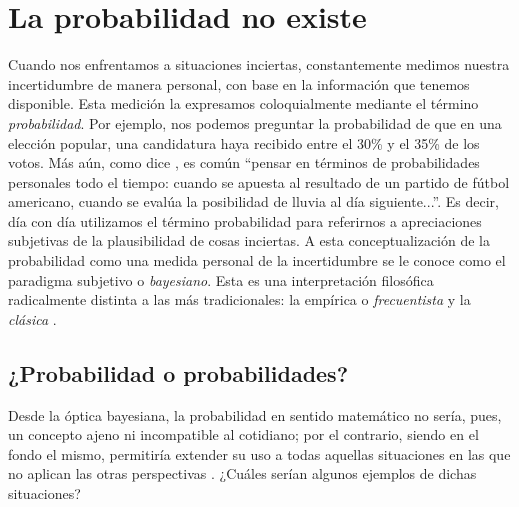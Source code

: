 \chapter{La probabilidad no existe}
	
	Cuando nos enfrentamos a situaciones inciertas, constantemente medimos nuestra incertidumbre de manera personal, con base en la información que tenemos disponible. Esta medición la expresamos coloquialmente mediante el término \textit{probabilidad}. Por ejemplo, nos podemos preguntar la probabilidad de que en una elección popular, una candidatura haya recibido entre el 30\% y el 35\% de los votos. Más aún, como dice \textcite[75]{Berger85}, es común ``pensar en términos de probabilidades personales todo el tiempo: cuando se apuesta al resultado de un partido de fútbol americano, cuando se evalúa la posibilidad de lluvia al día siguiente...''. Es decir, día con día utilizamos el término probabilidad para referirnos a apreciaciones subjetivas de la plausibilidad de cosas inciertas. A esta conceptualización de la probabilidad como una medida personal de la incertidumbre se le conoce como el paradigma subjetivo o \textit{bayesiano}. Esta es una interpretación filosófica radicalmente distinta a las más tradicionales: la empírica o \textit{frecuentista} y la \textit{clásica} \parencites[19,27]{Nozer17}[16]{GP16}. 
	
\section{¿Probabilidad o probabilidades?}

	Desde la óptica bayesiana, la probabilidad en sentido matemático no sería, pues, un concepto ajeno ni incompatible al cotidiano; por el contrario, siendo en el fondo el mismo, permitiría extender su uso a todas aquellas situaciones en las que no aplican las otras perspectivas \parencite{Berger85,GP16}. ¿Cuáles serían algunos ejemplos de dichas situaciones?\\
	
